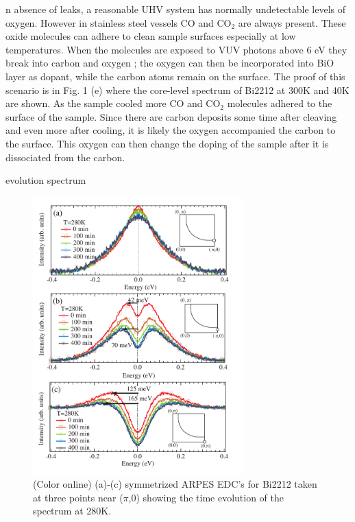 \documentclass[aps,twocolumn,amsmath,amssymb,showpacs,prb,
superscriptaddress,unsortedaddress]{revtex4}
\begin{document}
n absence of leaks, a reasonable UHV system has normally undetectable
levels of oxygen. However in stainless steel vessels CO and CO$_2$ are
always present. These oxide molecules can adhere to clean sample
surfaces especially at low temperatures. When the molecules are
exposed to VUV photons above 6 eV they break into carbon and oxygen
\cite{M. M. Halmann}; the oxygen can then be incorporated into BiO
layer as dopant, while the carbon atoms remain on the surface. The
proof of this scenario is in Fig. 1 (e) where the core-level spectrum
of Bi2212 at 300K and 40K are shown.  As the sample cooled more CO and
CO$_2$ molecules adhered to the surface of the sample. Since there are
carbon deposits some time after cleaving and even more after cooling,
it is likely the oxygen accompanied the carbon to the surface.  This
oxygen can then change the doping of the sample after it is
dissociated from the carbon. 

evolution spectrum
\begin{figure}
\includegraphics[width=3.2in]{fig3.pdf}
\caption{(Color online) (a)-(c) symmetrized ARPES EDC's for Bi2212
taken at three points near ($\pi$,0) showing the time evolution of the
spectrum at 280K.}
\label{Fig. 2}
\end{figure}
\end{document}
